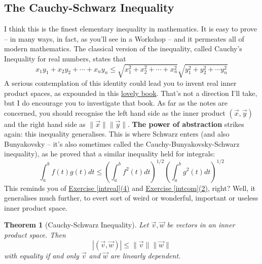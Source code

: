 \documentclass[11pt]{amsbook}
\newtheorem{theorem}{Theorem}[section]
\theoremstyle{definition}
\begin{document}
\subsection*{The Cauchy-Schwarz Inequality} I think this is the finest elementary inequality in mathematics. It is easy to prove -- in many ways, in fact, as you'll see in a Workshop -- and it permeates all of modern mathematics. The classical version of the inequality, called Cauchy's Inequality for real numbers, states that $$x_1y_1 + x_2y_2 + \cdots + x_ny_n \leqslant \sqrt{x_1^2 + x_2^2 + \cdots + x_n^2 }\sqrt{y_1^2 + y_2^2 + \cdots y_n^2}$$ A serious contemplation of this identity could lead you to invent real inner product spaces, as expounded in this \href{http://www-stat.wharton.upenn.edu/~steele/Publications/Books/CSMC/CSMC_index.html}{lovely book}. That's not a direction I'll take, but I do encourage you to investigate that book. As far as the notes are concerned, you should recognise the left hand side as the inner product $(\vec{x}, \vec{y})$ and the right hand side as $\| \vec{x}\| \| \vec{y}\|$. {\bf The power of abstraction} strikes again: this inequality generalises. This is where Schwarz enters (and also Bunyakovsky -- it's also sometimes called the Cauchy-Bunyakovsky-Schwarz inequality), as he proved that a similar inequality held for integrals: $$\int_a^b f(t)g(t) dt \leqslant \left( \int_a^b f^2(t)dt \right)^{1/2} \left(\int_a^b g^2(t)dt \right)^{1/2}$$ This reminds you of \hyperref[intreal]{Exercise \ref{intreal}(4)} and \hyperref[intcom]{Exercise \ref{intcom}(2)}, right? Well, it generalises much further, to evert sort of weird or wonderful, important or useless inner product space.

\begin{theorem}[Cauchy-Schwarz Inequality]
Let $\vec{v}, \vec{w}$ be vectors in an inner product space. Then $$| (\vec{v}, \vec{w}) | \leqslant \| \vec{v} \| \|\vec{w}\|$$ with equality if and only $\vec{v}$ and $\vec{w}$ are linearly dependent.
\end{theorem}
\end{document}
